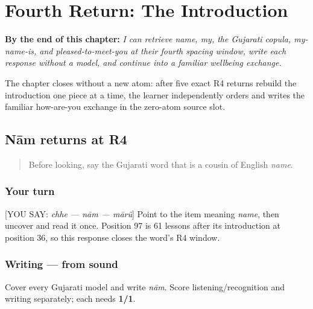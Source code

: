 
\chapter{Fourth Return: The Introduction}
\label{ch:gu-r4-introduction}

\begin{chapteropening}
\textbf{By the end of this chapter:} \emph{I can retrieve name, my, the Gujarati copula, my-name-is, and pleased-to-meet-you at their fourth spacing window, write each response without a model, and continue into a familiar wellbeing exchange.}

The chapter closes without a new atom: after five exact R4 returns rebuild the introduction one piece at a time, the learner independently orders and writes the familiar how-are-you exchange in the zero-atom source slot.
\end{chapteropening}

\section[Practice]{Nām returns at R4}

\label{lesson:GU-R16-naam-r4}



\begin{quote}
Before looking, say the Gujarati word that is a cousin of English \emph{name}.
\end{quote}

\subsection*{Your turn}
{[}YOU SAY: \emph{chhe — nām — mārũ}{]} Point to the item meaning \emph{name}, then uncover \textbf{} and read it once. Position 97 is 61 lessons after its introduction at position 36, so this response closes the word's R4 window.

\subsection*{Writing — from sound}
Cover every Gujarati model and write \emph{nām}. Score listening/recognition and writing separately; each needs \textbf{1/1}.

